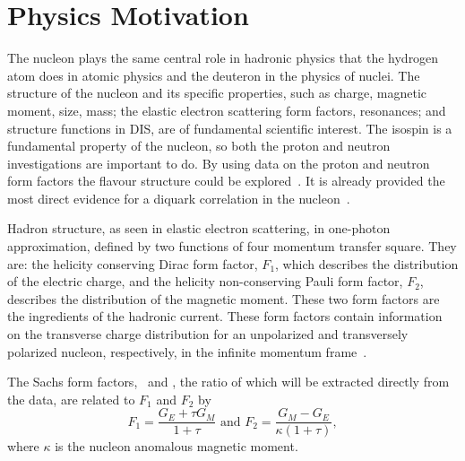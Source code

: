 %
\section{Physics Motivation}

\indent
The nucleon plays the same central role in hadronic physics that the hydrogen atom does in atomic physics and the deuteron in the physics of nuclei.
The structure of the nucleon and its specific properties, such as charge, magnetic moment, size, mass; the elastic electron scattering form factors, resonances; and structure functions in DIS, are of fundamental scientific interest.
The isospin is a fundamental property of the nucleon, so both the proton and neutron investigations are important to do.
By using data on the proton and neutron form factors the flavour structure could be explored~\cite{Cates:2011pz}.
It is already provided the most direct evidence for a diquark correlation in the nucleon~\cite{Roberts:2007jh, Segovia:2014aza, Wojtsekhowski:2020tlo}.

Hadron structure, as seen in elastic electron scattering, in one-photon approximation, defined by two functions of four momentum transfer square.
They are: the helicity conserving Dirac form factor, $F_1$, which describes the distribution of the electric charge, and the helicity non-conserving Pauli form factor, $F_2$, describes the distribution of the magnetic moment.
These two form factors are the ingredients of the hadronic current.  
These form factors contain information on the transverse charge distribution for an unpolarized and transversely polarized nucleon, respectively, 
in the infinite momentum frame~\cite{Miller:2007uy, Carlson:2007xd}.

The Sachs form factors, \gef~and \gmf, the ratio of which will be extracted directly from the data, are related to $F_1$ and $F_2$ by
%
\begin{equation}
F_{1} = \frac{G_{E} + \tau G_{M}}{1+\tau} \mbox{  and  }
F_{2} = \frac{G_{M} - G_{E}}{\kappa (1+\tau)},
\label{eq:f1f2}
\end{equation}
%
where $\kappa$ is the nucleon anomalous magnetic moment.

